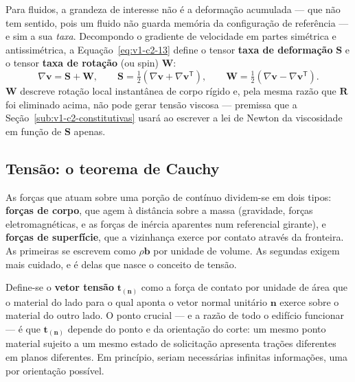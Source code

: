 \documentclass[12pt,a4paper]{article}
\numberwithin{equation}{section}
\numberwithin{table}{section}
\numberwithin{figure}{section}
\begin{document}
Para fluidos, a grandeza de interesse não é a deformação acumulada --- que não
tem sentido, pois um fluido não guarda memória da configuração de referência
--- e sim a sua \emph{taxa}. Decompondo o gradiente de velocidade em partes
simétrica e antissimétrica, a Equação~\eqref{eq:v1-c2-13} define o tensor
\textbf{taxa de deformação} $\mathbf{S}$ e o tensor \textbf{taxa de rotação}
(ou spin) $\mathbf{W}$:
\begin{equation}\label{eq:v1-c2-13}
\nabla\mathbf{v} = \mathbf{S} + \mathbf{W},
\qquad
\mathbf{S} = \tfrac{1}{2}\!\left(\nabla\mathbf{v} + \nabla\mathbf{v}^{\mathsf{T}}\right),
\qquad
\mathbf{W} = \tfrac{1}{2}\!\left(\nabla\mathbf{v} - \nabla\mathbf{v}^{\mathsf{T}}\right).
\end{equation}
$\mathbf{W}$ descreve rotação local instantânea de corpo rígido e, pela mesma
razão que $\mathbf{R}$ foi eliminado acima, não pode gerar tensão viscosa ---
premissa que a Seção~\ref{sub:v1-c2-constitutivas} usará ao escrever a lei de
Newton da viscosidade em função de $\mathbf{S}$ apenas.

\subsection{Tensão: o teorema de Cauchy}\label{sub:v1-c2-tensao}

As forças que atuam sobre uma porção de contínuo dividem-se em dois tipos:
\textbf{forças de corpo}, que agem à distância sobre a massa (gravidade, forças
eletromagnéticas, e as forças de inércia aparentes num referencial girante), e
\textbf{forças de superfície}, que a vizinhança exerce por contato através da
fronteira. As primeiras se escrevem como $\rho\mathbf{b}$ por unidade de
volume. As segundas exigem mais cuidado, e é delas que nasce o conceito de
tensão.

Define-se o \textbf{vetor tensão} $\mathbf{t}_{(\mathbf{n})}$ como a força de
contato por unidade de área que o material do lado para o qual aponta o vetor
normal unitário $\mathbf{n}$ exerce sobre o material do outro lado. O ponto
crucial --- e a razão de todo o edifício funcionar --- é que
$\mathbf{t}_{(\mathbf{n})}$ depende do ponto e da orientação do corte: um mesmo
ponto material sujeito a um mesmo estado de solicitação apresenta trações
diferentes em planos diferentes. Em princípio, seriam necessárias infinitas
informações, uma por orientação possível.
\end{document}
